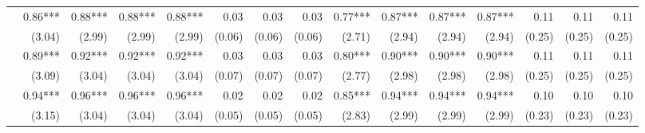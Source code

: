 \begin{tabularx}{1.45\textwidth}{lRRRRRRRRRRRRRR}
		 & \num{0.86}***\phantom{)} & \num{0.88}***\phantom{)} & \num{0.88}***\phantom{)} & \num{0.88}***\phantom{)} & \num{0.03}\phantom{***)} & \num{0.03}\phantom{***)} & \num{0.03}\phantom{***)} & \num{0.77}***\phantom{)} & \num{0.87}***\phantom{)} & \num{0.87}***\phantom{)} & \num{0.87}***\phantom{)} & \num{0.11}\phantom{***)} & \num{0.11}\phantom{***)} & \num{0.11}\phantom{***)} \\
		 & (\num{3.04})\phantom{***} & (\num{2.99})\phantom{***} & (\num{2.99})\phantom{***} & (\num{2.99})\phantom{***} & (\num{0.06})\phantom{***} & (\num{0.06})\phantom{***} & (\num{0.06})\phantom{***} & (\num{2.71})\phantom{***} & (\num{2.94})\phantom{***} & (\num{2.94})\phantom{***} & (\num{2.94})\phantom{***} & (\num{0.25})\phantom{***} & (\num{0.25})\phantom{***} & (\num{0.25})\phantom{***} \\ [\dspacing]
		 & \num{0.89}***\phantom{)} & \num{0.92}***\phantom{)} & \num{0.92}***\phantom{)} & \num{0.92}***\phantom{)} & \num{0.03}\phantom{***)} & \num{0.03}\phantom{***)} & \num{0.03}\phantom{***)} & \num{0.80}***\phantom{)} & \num{0.90}***\phantom{)} & \num{0.90}***\phantom{)} & \num{0.90}***\phantom{)} & \num{0.11}\phantom{***)} & \num{0.11}\phantom{***)} & \num{0.11}\phantom{***)} \\
		 & (\num{3.09})\phantom{***} & (\num{3.04})\phantom{***} & (\num{3.04})\phantom{***} & (\num{3.04})\phantom{***} & (\num{0.07})\phantom{***} & (\num{0.07})\phantom{***} & (\num{0.07})\phantom{***} & (\num{2.77})\phantom{***} & (\num{2.98})\phantom{***} & (\num{2.98})\phantom{***} & (\num{2.98})\phantom{***} & (\num{0.25})\phantom{***} & (\num{0.25})\phantom{***} & (\num{0.25})\phantom{***} \\ [\dspacing]
		 & \num{0.94}***\phantom{)} & \num{0.96}***\phantom{)} & \num{0.96}***\phantom{)} & \num{0.96}***\phantom{)} & \num{0.02}\phantom{***)} & \num{0.02}\phantom{***)} & \num{0.02}\phantom{***)} & \num{0.85}***\phantom{)} & \num{0.94}***\phantom{)} & \num{0.94}***\phantom{)} & \num{0.94}***\phantom{)} & \num{0.10}\phantom{***)} & \num{0.10}\phantom{***)} & \num{0.10}\phantom{***)} \\
		 & (\num{3.15})\phantom{***} & (\num{3.04})\phantom{***} & (\num{3.04})\phantom{***} & (\num{3.04})\phantom{***} & (\num{0.05})\phantom{***} & (\num{0.05})\phantom{***} & (\num{0.05})\phantom{***} & (\num{2.83})\phantom{***} & (\num{2.99})\phantom{***} & (\num{2.99})\phantom{***} & (\num{2.99})\phantom{***} & (\num{0.23})\phantom{***} & (\num{0.23})\phantom{***} & (\num{0.23})\phantom{***} \\ [\dspacing]

\end{tabularx}

